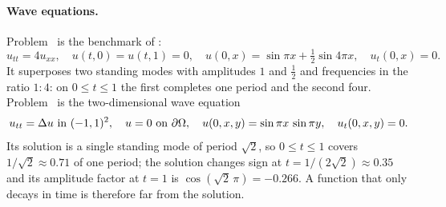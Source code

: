 \paragraph{Wave equations.}
Problem \PWone\ is the benchmark of \citet[Sec.~7.3]{wangyu2022}:
\begin{equation}\label{s2_problems:eq:wave1d}
u_{tt}=4u_{xx},\quad u(t,0)=u(t,1)=0,\quad u(0,x)=\sin\pi x+\tfrac12\sin4\pi x,\quad
u_t(0,x)=0 .
\end{equation}
It superposes two standing modes with amplitudes $1$ and $\tfrac12$ and frequencies in the
ratio $1:4$: on $0\le t\le 1$ the first completes one period and the second four.
Problem \PWtwo\ is the two-dimensional wave equation
\begin{equation}\label{s2_problems:eq:wave2d}
u_{tt}=\Delta u\ \text{in }(-1,1)^2,\quad u=0\ \text{on }\partial\Omega,\quad
u(0,x,y)=\sin\pi x\,\sin\pi y,\quad u_t(0,x,y)=0 .
\end{equation}
Its solution is a single standing mode of period $\sqrt2$, so $0\le t\le 1$ covers
$1/\sqrt2\approx 0.71$ of one period; the solution changes sign at $t=1/(2\sqrt2)\approx 0.35$
and its amplitude factor at $t=1$ is $\cos(\sqrt2\,\pi)=-0.266$. A function that only decays
in time is therefore far from the solution.

